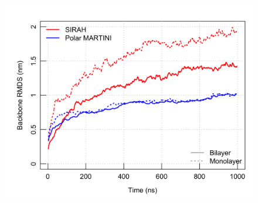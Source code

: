 \begin{figure}
    \begin{minipage}[c]{0.5\textwidth}
        \includegraphics[width=\linewidth]{3results_capsule/pics/compare_MonoBi_rmsd.png} \\
    \end{minipage}
    \begin{minipage}[c]{0.48\textwidth}

\end{minipage}
\end{figure}
